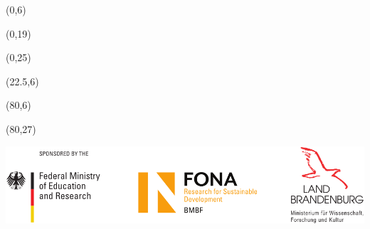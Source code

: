 \documentclass[20pt]{beamer}
\begin{document}
    \begin{frame}

        \begin{textblock}{20}(0,6)
            
        \end{textblock}

        \begin{textblock}{20}(0,19)
            
        \end{textblock}

        \begin{textblock}{20}(0,25)
            
        \end{textblock}

        \begin{textblock}{55}(22.5,6)
            
        \end{textblock}

        \begin{textblock}{20}(80,6)
            
        \end{textblock}


%
        \begin{textblock}{20}(80,27)
            \begin{WhiteBox}
                \vspace{-1cm}
                \begin{block}{}
                    \includegraphics[width=\textwidth]{img/Sponsor_logos}
                \end{block}
            \end{WhiteBox}
        \end{textblock}
    \end{frame}
\end{document}
